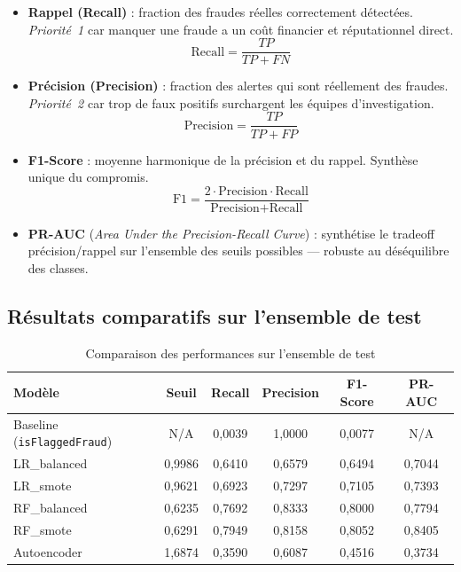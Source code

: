 \begin{itemize}
  \item \textbf{Rappel (Recall)} : fraction des fraudes réelles correctement détectées.
    \textit{Priorité~1} car manquer une fraude a un coût financier et réputationnel direct.
    \[
    \text{Recall} = \frac{TP}{TP + FN}
    \]
  \item \textbf{Précision (Precision)} : fraction des alertes qui sont réellement des
    fraudes. \textit{Priorité~2} car trop de faux positifs surchargent les équipes
    d'investigation.
    \[
    \text{Precision} = \frac{TP}{TP + FP}
    \]
  \item \textbf{F1-Score} : moyenne harmonique de la précision et du rappel. Synthèse
    unique du compromis.
    \[
    \text{F1} = \frac{2 \cdot \text{Precision} \cdot \text{Recall}}
    {\text{Precision} + \text{Recall}}
    \]
  \item \textbf{PR-AUC} (\textit{Area Under the Precision-Recall Curve}) : synthétise
    le tradeoff précision/rappel sur l'ensemble des seuils possibles --- robuste au
    déséquilibre des classes.
\end{itemize}

\subsection{Résultats comparatifs sur l'ensemble de test}

\begin{table}[H]
\centering
\caption{Comparaison des performances sur l'ensemble de test}
\label{tab:results_comparison}
\begin{tabular}{lccccc}
\toprule
\textbf{Modèle} & \textbf{Seuil} & \textbf{Recall}
  & \textbf{Precision} & \textbf{F1-Score} & \textbf{PR-AUC} \\
\midrule
Baseline (\texttt{isFlaggedFraud}) & N/A    & 0,0039 & 1,0000 & 0,0077 & N/A \\
LR\_balanced                       & 0,9986 & 0,6410 & 0,6579 & 0,6494 & 0,7044 \\
LR\_smote                          & 0,9621 & 0,6923 & 0,7297 & 0,7105 & 0,7393 \\
RF\_balanced                       & 0,6235 & 0,7692 & 0,8333 & 0,8000 & 0,7794 \\
RF\_smote                          & 0,6291 & 0,7949 & 0,8158 & 0,8052 & 0,8405 \\
Autoencoder                        & 1,6874 & 0,3590 & 0,6087 & 0,4516 & 0,3734 \\
\bottomrule
\end{tabular}
\end{table}

